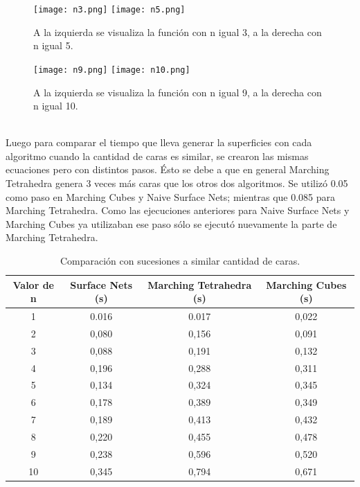 \documentclass[12pt]{article}
\begin{document}
\begin{figure}[h!]
\texttt{[image: n3.png]}
\hfill
\texttt{[image: n5.png]}
\caption{ A la izquierda se visualiza la función con n igual 3, a la derecha con n igual 5.}
\label{ fig : surface }
\end{figure}
\begin{figure}[h!]
\texttt{[image: n9.png]}
\hfill
\texttt{[image: n10.png]}
\caption{ A la izquierda se visualiza la función con n igual 9, a la derecha con n igual 10.}
\label{ fig : surface }
\end{figure}
\\Luego para comparar el tiempo que lleva generar la superficies con cada algoritmo cuando la cantidad de caras es similar, se crearon las mismas ecuaciones pero con distintos pasos. Ésto se debe a que en general Marching Tetrahedra genera 3 veces más caras que los otros dos algoritmos. Se utilizó 0.05 como paso en Marching Cubes y Naive Surface Nets; mientras que 0.085 para Marching Tetrahedra. Como las ejecuciones anteriores para Naive Surface Nets y Marching Cubes ya utilizaban ese paso sólo se ejecutó nuevamente la parte de Marching Tetrahedra.
\begin{table}[h!]
  \centering
  \label{tab:table1}
  \begin{tabular}{cccc}
    \toprule
    Valor de n & Surface Nets (s) & Marching Tetrahedra (s) & Marching Cubes (s)\\
    \midrule
    1 & 0.016 & 0.017 & 0,022\\
    2 & 0,080 & 0,156 & 0,091\\
    3 & 0,088 & 0,191 & 0,132\\
    4 & 0,196 & 0,288 & 0,311\\
    5 & 0,134 & 0,324 & 0,345\\
    6 & 0,178 & 0,389 & 0,349\\
    7 & 0,189 & 0,413 & 0,432\\
    8 & 0,220 & 0,455 & 0,478\\
    9 & 0,238 & 0,596 & 0,520\\
    10 & 0,345 & 0,794 & 0,671\\
    \bottomrule
  \end{tabular}
  \caption{Comparación con sucesiones a similar cantidad de caras.}
\end{table}
\clearpage
\end{document}

